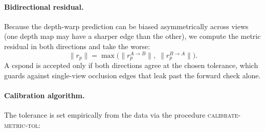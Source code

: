 \documentclass{article}
\begin{document}
		\paragraph{Bidirectional residual.}
		Because the depth-warp prediction can be biased asymmetrically
		across views (one depth map may have a sharper edge than the
		other), we compute the metric residual in both directions and
		take the worse:
		\begin{equation}
			\|r_p\|
			= \max\bigl(\|r_p^{A\to B}\|,\;
			\|r_p^{B\to A}\|\bigr).
		\end{equation}
		A cspond is accepted only if both directions agree at the
		chosen tolerance, which guards against single-view occlusion
		edges that leak past the forward check alone.

		\paragraph{Calibration algorithm.}
		The tolerance is set empirically from the data via the procedure
		\textsc{calibrate-metric-tol}:
\end{document}
